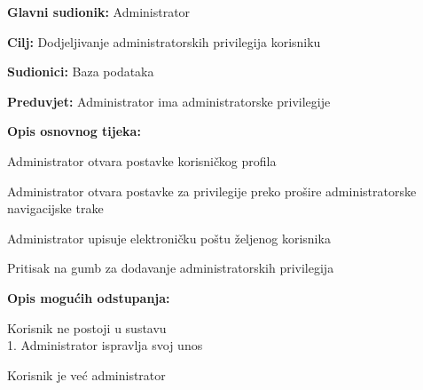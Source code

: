 					
					\noindent {}
					\begin{packed_item}
						\item \textbf{Glavni sudionik:} Administrator
						\item \textbf{Cilj:} Dodjeljivanje administratorskih privilegija korisniku
						\item \textbf{Sudionici:} Baza podataka
						\item \textbf{Preduvjet:} Administrator ima administratorske privilegije
						\item \textbf{Opis osnovnog tijeka:}
						\begin{packed_enum}
							\item Administrator otvara postavke korisničkog profila
							\item Administrator otvara postavke za privilegije preko prošire administratorske navigacijske trake
							\item Administrator upisuje elektroničku poštu željenog korisnika 
							\item Pritisak na gumb za dodavanje administratorskih privilegija
						\end{packed_enum}
						\item \textbf{Opis mogućih odstupanja:}
						\begin{packed_item}
							\item [3.a] Korisnik ne postoji u sustavu
							\\1. Administrator ispravlja svoj unos
							\item [4.a] Korisnik je već administrator
						\end{packed_item}
					\end{packed_item}


